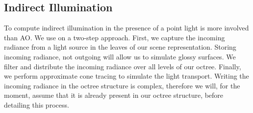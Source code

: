 \subsection{Indirect Illumination}
To compute indirect illumination in the presence of a point light is more involved than AO. We use on a two-step approach. First, we capture the incoming radiance from a light source in the leaves of our scene representation. Storing incoming radiance, not outgoing will allow us to simulate glossy surfaces. We filter and distribute the incoming radiance over all levels of our octree. Finally, we perform approximate cone tracing to simulate the light transport. Writing the incoming radiance in the octree structure is complex, therefore we will, for the moment, assume that it is already present in our octree structure, before detailing this process.

